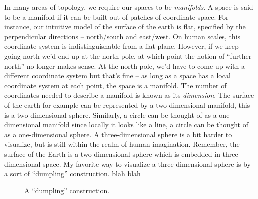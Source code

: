 In many areas of topology, we require our spaces to be \emph{manifolds}.
A space is said to be a manifold if it can be built out of patches of coordinate space. For instance, our intuitive model of the surface of the earth is flat, specified by the perpendicular directions -- north/south and east/west. On human scales, this coordinate system is indistinguishable from a flat plane. However, if we keep going north we'd end up at the north pole, at which point the notion of ``further north'' no longer makes sense. At the north pole, we'd have to come up with a different coordinate system but that's fine -- as long as a space has a local coordinate system at each point, the space is a manifold. The number of coordinates needed to describe a manifold is known as its \emph{dimension}. The surface of the earth for example can be represented by a two-dimensional manifold, this is a two-dimensional sphere. Similarly, a circle can be thought of as a one-dimensional manifold since locally it looks like a line, a circle can be thought of as a one-dimensional sphere.
A three-dimensional sphere is a bit harder to visualize, but is still within the realm of human imagination. Remember, the surface of the Earth is a two-dimensional sphere which is embedded in three-dimensional space. My favorite way to visualize a three-dimensional sphere is by a sort of ``dumpling'' construction. blah blah 
\begin{figure}[ht]
	\centering
	\medskip
	\caption{A ``dumpling'' construction.}
\end{figure}


